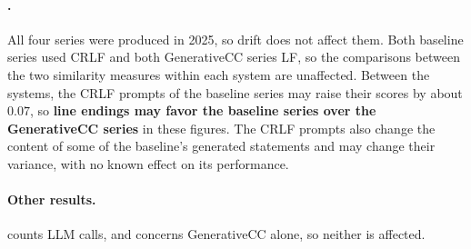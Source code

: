 \documentclass[letterpaper]{article} %
\begin{document}
\paragraph{.}
All four series were produced in 2025, so drift does not affect them.
Both baseline series used CRLF and both GenerativeCC series LF, so the comparisons between the two similarity measures within each system are unaffected.
Between the systems, the CRLF prompts of the baseline series may raise their scores by about \(0.07\), so \textbf{line endings may favor the baseline series over the GenerativeCC series} in these figures.
The CRLF prompts also change the content of some of the baseline's generated statements and may change their variance, with no known effect on its performance.

\paragraph{Other results.}
 counts LLM calls, and  concerns GenerativeCC alone, so neither is affected.
\end{document}
